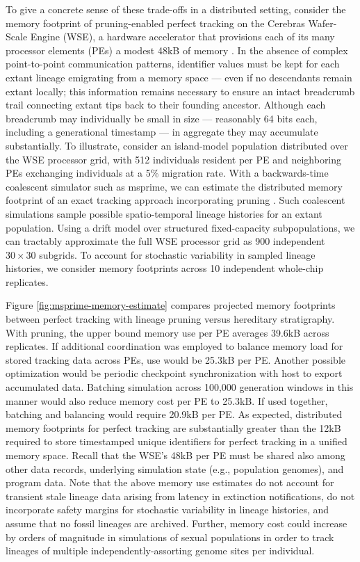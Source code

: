 To give a concrete sense of these trade-offs in a distributed setting, consider the memory footprint of pruning-enabled perfect tracking on the Cerebras Wafer-Scale Engine (WSE), a hardware accelerator that provisions each of its many processor elements (PEs) a modest 48kB of memory \citep{cerebras2021wafer}.
In the absence of complex point-to-point communication patterns, identifier values must be kept for each extant lineage emigrating from a memory space --- even if no descendants remain extant locally;
this information remains necessary to ensure an intact breadcrumb trail connecting extant tips back to their founding ancestor.
Although each breadcrumb may individually be small in size --- reasonably 64 bits each, including a generational timestamp --- in aggregate they may accumulate substantially.
To illustrate, consider an island-model population distributed over the WSE processor grid, with 512 individuals resident per PE and neighboring PEs exchanging individuals at a 5\% migration rate.
With a backwards-time coalescent simulator such as msprime, we can estimate the distributed memory footprint of an exact tracking approach incorporating pruning \citep{baumdicker2022efficient}.
Such coalescent simulations sample possible spatio-temporal lineage histories for an extant population.
Using a drift model over structured fixed-capacity subpopulations, we can tractably approximate the full WSE processor grid as 900 independent $30 \times 30$ subgrids.
To account for stochastic variability in sampled lineage histories, we consider memory footprints across 10 independent whole-chip replicates.

Figure \ref{fig:msprime-memory-estimate} compares projected memory footprints between perfect tracking with lineage pruning versus hereditary stratigraphy.
With pruning, the upper bound memory use per PE averages 39.6kB across replicates.
If additional coordination was employed to balance memory load for stored tracking data across PEs, use would be 25.3kB per PE.
Another possible optimization would be periodic checkpoint synchronization with host to export accumulated data.
Batching simulation across 100,000 generation windows in this manner would also reduce memory cost per PE to 25.3kB.
If used together, batching and balancing would require 20.9kB per PE.
As expected, distributed memory footprints for perfect tracking are substantially greater than the 12kB required to store timestamped unique identifiers for perfect tracking in a unified memory space.
Recall that the WSE's 48kB per PE must be shared also among other data records, underlying simulation state (e.g., population genomes), and program data.
Note that the above memory use estimates do not account for transient stale lineage data arising from latency in extinction notifications, do not incorporate safety margins for stochastic variability in lineage histories, and assume that no fossil lineages are archived.
Further, memory cost could increase by orders of magnitude in simulations of sexual populations in order to track lineages of multiple independently-assorting genome sites per individual.

